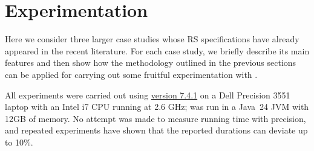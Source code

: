 
\section{Experimentation}\label{sec:experiments}

Here we consider 
three larger case studies whose RS specifications have already appeared in the recent literature. For each case study, we briefly describe its main features and then show how the methodology outlined in the previous sections can be applied for carrying out some fruitful experimentation with \GROOVE.

All \GROOVE experiments were carried out using \href{https://github.com/nl-utwente-groove/code/releases/tag/release-7_4_1}{\GROOVE version 7.4.1} on a Dell Precision 3551 laptop with an Intel i7 CPU running at 2.6 GHz; \GROOVE was run in a Java~24 JVM with 12GB of memory. No attempt was made to measure running time with precision, and repeated experiments have shown that the reported durations can deviate up to 10\%.
